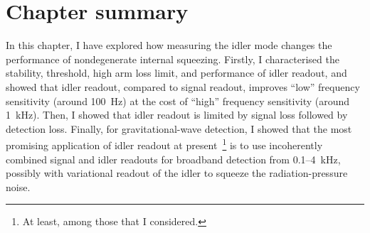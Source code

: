 \section{Chapter summary}

In this chapter, I have explored how measuring the idler mode changes the performance of nondegenerate internal squeezing. %
Firstly, I characterised the stability, threshold, high arm loss limit, and performance of idler readout, %
and showed that idler readout, compared to signal readout, improves ``low'' frequency sensitivity (around 100~Hz) at the cost of ``high'' frequency sensitivity (around 1~kHz).
Then, I showed that idler readout is limited by signal loss followed by detection loss.  %
Finally, for gravitational-wave detection, I showed that the most promising application of idler readout at present~\footnote{At least, among those that I considered.} is to use incoherently combined signal and idler readouts for broadband detection from 0.1--4~kHz, possibly with variational readout of the idler to squeeze the radiation-pressure noise. %



